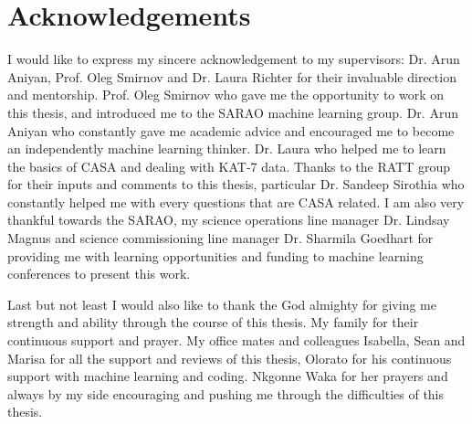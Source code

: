 \chapter*{Acknowledgements} 

I would like to express my sincere acknowledgement to my supervisors: Dr. Arun Aniyan, Prof. Oleg Smirnov and Dr. Laura Richter for their invaluable direction and mentorship.  Prof. Oleg Smirnov who gave me the opportunity to work on this thesis, and introduced me to the SARAO machine learning group. Dr. Arun Aniyan who constantly gave me academic advice and encouraged me to become an independently machine learning thinker. Dr. Laura who helped me to learn the basics of CASA and dealing with KAT-7 data. Thanks to the RATT group for their inputs and comments to this thesis, particular Dr. Sandeep Sirothia who constantly helped me with every questions that are CASA related. I am also very thankful towards the SARAO, my science operations line manager Dr. Lindsay Magnus and science commissioning line manager Dr. Sharmila Goedhart for providing me with learning opportunities and funding to machine learning conferences to present this work.

Last but not least I would also like to thank the God almighty for giving me strength and ability through the course of this thesis. My family  for their continuous support and prayer. My office mates and colleagues Isabella, Sean and Marisa for all the support and reviews of this thesis, Olorato for his continuous support with machine learning and coding. Nkgonne Waka for her prayers and always by my side encouraging and pushing me through the difficulties of this thesis. 